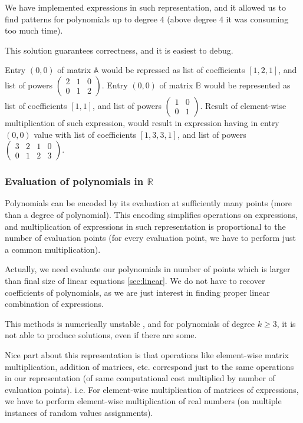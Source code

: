 We have implemented expressions in such representation, and it allowed us
to find patterns for polynomials up to degree $4$ (above degree $4$ it was consuming too much time).

This solution guarantees correctness, and it is easiest to debug.

Entry $(0, 0)$ of matrix $\mathbb{A}$ would be repressed as list of coefficients $[1, 2, 1]$, and list
of powers $\begin{pmatrix} 2 & 1 & 0\\ 0 & 1 & 2 \end{pmatrix}$. Entry $(0, 0)$ of matrix $\mathbb{B}$ would
be represented as list of coefficients $[1, 1]$, and list of powers 
$\begin{pmatrix} 1 & 0 \\ 0 & 1 \end{pmatrix}$. Result of element-wise multiplication of such expression,
would result in expression having in entry $(0, 0)$ value with list of coefficients $[1, 3, 3, 1]$, and
list of powers $\begin{pmatrix} 3 & 2 & 1 & 0 \\ 0 & 1 & 2 & 3 \end{pmatrix}$. 


\subsubsection{Evaluation of polynomials in $\mathbb{R}$}
Polynomials can be encoded 
by its evaluation at sufficiently many points (more than a degree of polynomial).
This encoding simplifies operations on expressions, and multiplication of expressions
in such representation is proportional to the number of evaluation points (for every evaluation
point, we have to perform just a common multiplication).

Actually, we need evaluate our polynomials in number of points which is larger 
than final size of linear equations \ref{sec:linear}. We do not have to recover coefficients of polynomials,
as we are just interest in finding proper linear combination of expressions.


This methods is numerically unstable
, and for polynomials of degree $k \geq 3$, it is not able to produce solutions, even if there are some.

Nice part about this representation is that operations like element-wise matrix multiplication, addition of matrices, etc.
correspond just to the same operations in our representation (of same computational cost multiplied by number of evaluation points). i.e. 
For element-wise multiplication of matrices of expressions, we
have to perform element-wise multiplication of real numbers (on multiple instances of random values assignments).

